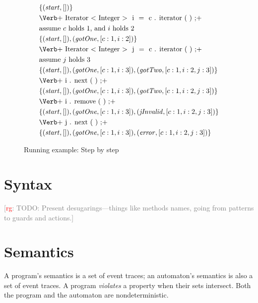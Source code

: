 \documentclass[preprint]{sigplanconf} %
\newcommand{\note}[2]{\textcolor{gray}{[\textcolor{red}{#1}: #2]}}
\newcommand{\rg}[1]{\note{rg}{#1}}
\theoremstyle{definition}
\begin{document}
\begin{figure}
\begin{align*}
&\{(\mathit{start}, [])\} \\
&\text{\Verb+\PY{n}{Iterator}\PY{o}{<}\PY{n}{Integer}\PY{o}{>} \PY{n}{i} \PY{o}{=} \PY{n}{c}\PY{o}{.}\PY{n+na}{iterator}\PY{o}{(}\PY{o}{)}\PY{o}{;}+} \\
&\text{assume $c$ holds $1$, and $i$ holds $2$ } \\
&\{(\mathit{start},[]), (\mathit{gotOne},[c:1, i:2])\} \\
&\text{\Verb+\PY{n}{Iterator}\PY{o}{<}\PY{n}{Integer}\PY{o}{>} \PY{n}{j} \PY{o}{=} \PY{n}{c}\PY{o}{.}\PY{n+na}{iterator}\PY{o}{(}\PY{o}{)}\PY{o}{;}+}\\
&\text{assume $j$ holds $3$} \\
&\{(\mathit{start},[]), (\mathit{gotOne},[c:1,i:3]),(\mathit{gotTwo},[c:1,i:2,j:3])\} \\
&\text{\Verb+\PY{n}{i}\PY{o}{.}\PY{n+na}{next}\PY{o}{(}\PY{o}{)}\PY{o}{;}+} \\
&\{(\mathit{start},[]), (\mathit{gotOne},[c:1,i:3]),(\mathit{gotTwo},[c:1,i:2,j:3])\}\\
&\text{\Verb+\PY{n}{i}\PY{o}{.}\PY{n+na}{remove}\PY{o}{(}\PY{o}{)}\PY{o}{;}+} \\
&\{(\mathit{start},[]), (\mathit{gotOne},[c:1,i:3]),(\mathit{jInvalid},[c:1,i:2,j:3])\} \\
&\text{\Verb+\PY{n}{j}\PY{o}{.}\PY{n+na}{next}\PY{o}{(}\PY{o}{)}\PY{o}{;}+}\\
&\{(\mathit{start},[]), (\mathit{gotOne},[c:1,i:3]), (\mathit{error},[c:1,i:2,j:3])\}
\end{align*}
\caption{Running example: Step by step}
\label{fig:running.steps}
\end{figure}

\section{Syntax}\label{sec:syntax} %

\rg{TODO: Present desugarings---things like methods names, going from patterns to guards and actions.}

\section{Semantics}\label{sec:semantics} %

A program's semantics is a set of event traces;
an automaton's semantics is also a set of event traces.
A program \emph{violates} a property when their sets intersect.
Both the program and the automaton are nondeterministic.
\end{document}
